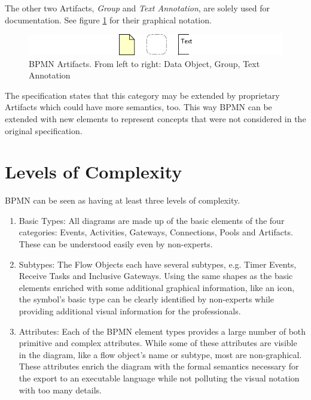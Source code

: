 The other two Artifacts, \emph{Group} and \emph{Text Annotation}, are solely used
for documentation.  See figure \ref{fig:artifacts} for their graphical notation.

\begin{figure}[ht]
	\centering
	\includegraphics[width=.75\textwidth]{figures/bpmn/artifacts.png}
	\caption[BPMN Artifacts]{BPMN Artifacts.  From left to right: Data Object,
	Group, Text Annotation}
	\label{fig:artifacts}
\end{figure}

The specification states that this category may be extended by proprietary
Artifacts which could have more semantics, too.  This way BPMN can be extended
with new elements to represent concepts that were not considered in the original
specification.



\section{Levels of Complexity}
\label{sec:bpmn_complexity}

BPMN can be seen as having at least three levels of complexity.

\begin{enumerate}
	\item Basic Types: All diagrams are made up of the basic elements of the four
	categories: Events, Activities, Gateways, Connections, Pools and Artifacts.
	These can be understood easily even by non-experts.
	
	\item Subtypes: The Flow Objects each have several subtypes, e.g.  Timer
	Events, Receive Tasks and Inclusive Gateways.  Using the same shapes as the
	basic elements enriched with some additional graphical information, like an
	icon, the symbol's basic type can be clearly identified by non-experts while
	providing additional visual information for the professionals.
	
	\item Attributes: Each of the BPMN element types provides a large number of
	both primitive and complex attributes.  While some of these attributes are
	visible in the diagram, like a flow object's name or subtype, most are
	non-graphical.  These attributes enrich the diagram with the formal semantics
	necessary for the export to an executable language while not polluting the
	visual notation with too many details.
\end{enumerate}

